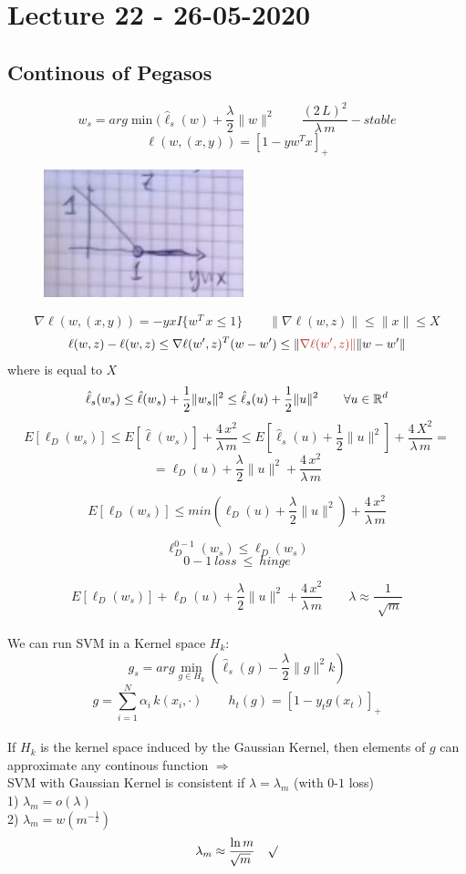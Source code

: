 \documentclass[../main.tex]{subfiles}
\begin{document}
\chapter{Lecture 22 - 26-05-2020}

\section{Continous of Pegasos}
$$
w_s = arg \min (\hat{\ell}_s(w) + \frac{\lambda}{2} \|w\|^2 
\qquad \frac{(2 \, L )^2}{\lambda \, m}-stable
$$
$$
\ell(w, (x,y)) = \left[ 1 - y w^T x \right]_+
$$
\begin{figure}[h]
    \centering
    \includegraphics[width=0.3\linewidth]{../img/lez22-img1.JPG}
    \caption{}
\end{figure}
$$
\nabla \ell(w, (x,y)) = - y x I \{ w^T \, x \leq 1 \} \qquad \| \nabla \ell(w,z) \| \leq \|x \| \leq X
$$
$$
\ell(w,z) - \ell(w,z) \leq \nabla \ell(w',z)^T (w-w') \leq \| \red{ \nabla \ell(w',z) \| } \| w-w'\|
$$
where  is equal to $X$
$$
\hat{\ell}_s(w_s) \leq \hat{\ell}(w_s) + \frac{1}{2} \|w_s \|^2 \leq \hat{\ell}_s(u) + \frac{1}{2} \| u \|^2 \qquad \forall u \in \mathbb{R}^d
$$
$$
E [ \ell_D(w_s)] \leq  E[ \hat{\ell}(w_s)] + \frac{4 \, x^2}{\lambda \, m} \leq E [ \hat{\ell}_s(u) + \frac{1}{2} \|u\|^2 ] + \frac{4 \, X^2}{\lambda \, m} =
$$
$$
= \ell_D(u) + \frac{\lambda}{2} \| u \|^2 + \frac{4 \, x^2}{\lambda \, m}
$$

$$
E [ \ell_D(w_s) ] \leq min( \ell_D(u) + \frac{\lambda}{2}
\| u\|^2) +\frac{4 \, x^2}{\lambda \, m} $$

$$
\ell_D^{0-1}(w_s) \leq \ell_D(w_s)
$$
$$
0-1 \ loss \ \leq \ hinge
$$

$$
E [ \ell_D(w_s) ] + \ell_D(u) + \frac{\lambda}{2} \|u \|^2 + \frac{4 \, x^2}{\lambda \, m } \qquad \lambda \approx \frac{1}{\sqrt[]{m}}
$$
\\
We can run SVM in a Kernel space $H_k$:
$$
g_s = arg \min_{g \in H_k} (\hat{\ell}_s(g) - \frac{\lambda}{2} \|g\|^2 k )  
$$
$$
g = \sum_{i = 1}^N \alpha_i \, k (x_i, \cdot) \qquad h_t(g) = [ 1-y_t g(x_t) ]_+
$$
\\
If $H_k$ is the kernel space induced by the Gaussian Kernel, then elements of $g$ can approximate any continous function $\Rightarrow$ 
\\
SVM with Gaussian Kernel is consistent if $\lambda = \lambda_m $ \qquad (with $0$-$1$ loss)
\\
1) $\lambda_m = o(\lambda)$\\
2) $\lambda_m = w (m^{-\frac{1}{2}}) $
\\
$$
\lambda_m \approx \frac{\ln m}{\sqrt[]{m}} \quad  \surd
$$\\
\end{document}
